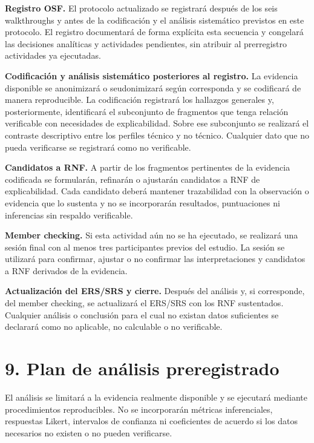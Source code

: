 \documentclass[9pt,a4paper]{extarticle}
\begin{document}
\textbf{Registro OSF.} El protocolo actualizado se registrará después de los seis walkthroughs y antes de la codificación y el análisis sistemático previstos en este protocolo. El registro documentará de forma explícita esta secuencia y congelará las decisiones analíticas y actividades pendientes, sin atribuir al prerregistro actividades ya ejecutadas.

\textbf{Codificación y análisis sistemático posteriores al registro.} La evidencia disponible se anonimizará o seudonimizará según corresponda y se codificará de manera reproducible. La codificación registrará los hallazgos generales y, posteriormente, identificará el subconjunto de fragmentos que tenga relación verificable con necesidades de explicabilidad. Sobre ese subconjunto se realizará el contraste descriptivo entre los perfiles técnico y no técnico. Cualquier dato que no pueda verificarse se registrará como no verificable.

\textbf{Candidatos a RNF.} A partir de los fragmentos pertinentes de la evidencia codificada se formularán, refinarán o ajustarán candidatos a RNF de explicabilidad. Cada candidato deberá mantener trazabilidad con la observación o evidencia que lo sustenta y no se incorporarán resultados, puntuaciones ni inferencias sin respaldo verificable.

\textbf{Member checking.} Si esta actividad aún no se ha ejecutado, se realizará una sesión final con al menos tres participantes previos del estudio. La sesión se utilizará para confirmar, ajustar o no confirmar las interpretaciones y candidatos a RNF derivados de la evidencia.

\textbf{Actualización del ERS/SRS y cierre.} Después del análisis y, si corresponde, del member checking, se actualizará el ERS/SRS con los RNF sustentados. Cualquier análisis o conclusión para el cual no existan datos suficientes se declarará como no aplicable, no calculable o no verificable.

\section*{9. Plan de análisis preregistrado}

El análisis se limitará a la evidencia realmente disponible y se ejecutará mediante procedimientos reproducibles. No se incorporarán métricas inferenciales, respuestas Likert, intervalos de confianza ni coeficientes de acuerdo si los datos necesarios no existen o no pueden verificarse.
\end{document}
